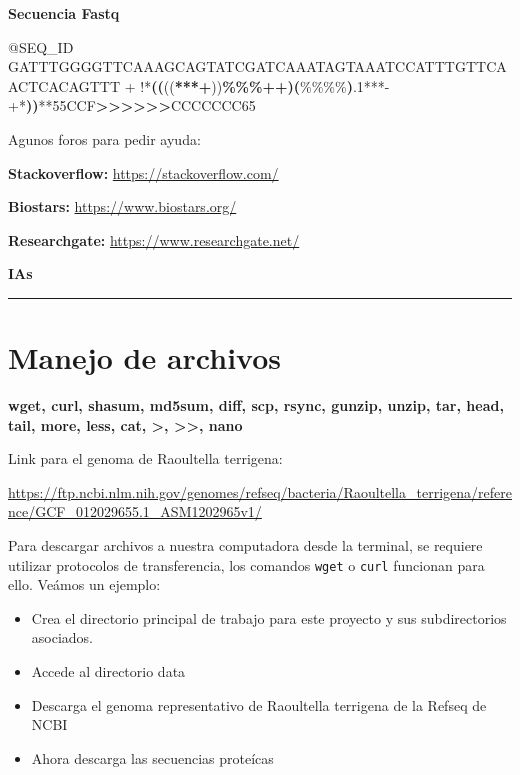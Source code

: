 \documentclass[
]{book}
\newenvironment{Shaded}{\begin{snugshade}}{\end{snugshade}}
\newcommand{\ErrorTok}[1]{\textcolor[rgb]{0.64,0.00,0.00}{\textbf{#1}}}
\newcommand{\ExtensionTok}[1]{#1}
\newcommand{\KeywordTok}[1]{\textcolor[rgb]{0.13,0.29,0.53}{\textbf{#1}}}
\newcommand{\NormalTok}[1]{#1}
\newcommand{\OperatorTok}[1]{\textcolor[rgb]{0.81,0.36,0.00}{\textbf{#1}}}
\newcommand{\StringTok}[1]{\textcolor[rgb]{0.31,0.60,0.02}{#1}}
\begin{document}
\textbf{Secuencia Fastq }

\begin{Shaded}
\begin{Highlighting}[]
\ExtensionTok{@SEQ\_ID}
\ExtensionTok{GATTTGGGGTTCAAAGCAGTATCGATCAAATAGTAAATCCATTTGTTCAACTCACAGTTT}
\ExtensionTok{+}
\ExtensionTok{!}\StringTok{\textquotesingle{}\textquotesingle{}}\ExtensionTok{*}\ErrorTok{((}\NormalTok{((}\OperatorTok{***+}\NormalTok{))}\OperatorTok{\%\%\%++}\KeywordTok{)(}\ExtensionTok{\%\%\%\%}\KeywordTok{)}\ExtensionTok{.1***{-}+*}\StringTok{\textquotesingle{}\textquotesingle{}}\KeywordTok{)}\ErrorTok{)}\ExtensionTok{**55CCF}\OperatorTok{\textgreater{}\textgreater{}\textgreater{}\textgreater{}\textgreater{}\textgreater{}}\NormalTok{CCCCCCC65}
\end{Highlighting}
\end{Shaded}

Agunos foros para pedir ayuda:

\textbf{Stackoverflow:} \url{https://stackoverflow.com/}

\textbf{Biostars:} \url{https://www.biostars.org/}

\textbf{Researchgate:} \url{https://www.researchgate.net/}

\textbf{IAs}

\begin{center}\rule{0.5\linewidth}{0.5pt}\end{center}

\section{Manejo de archivos}\label{manejo-de-archivos-1}

\textbf{wget, curl, shasum, md5sum, diff, scp, rsync, gunzip, unzip, tar, head, tail, more, less, cat, \textgreater, \textgreater\textgreater, nano}

Link para el genoma de Raoultella terrigena:

\url{https://ftp.ncbi.nlm.nih.gov/genomes/refseq/bacteria/Raoultella_terrigena/reference/GCF_012029655.1_ASM1202965v1/}

Para descargar archivos a nuestra computadora desde la terminal, se requiere utilizar protocolos de transferencia, los comandos \texttt{wget} o \texttt{curl} funcionan para ello. Veámos un ejemplo:

\begin{itemize}
\item
  Crea el directorio principal de trabajo para este proyecto y sus subdirectorios asociados.
\item
  Accede al directorio data
\item
  Descarga el genoma representativo de Raoultella terrigena de la Refseq de NCBI
\item
  Ahora descarga las secuencias proteícas
\end{itemize}
\end{document}
